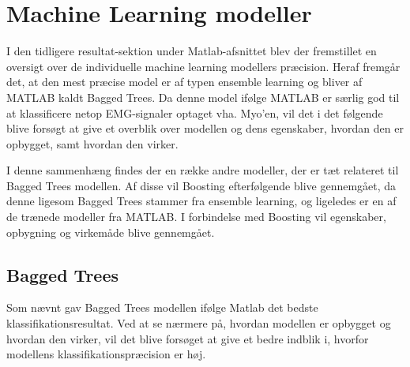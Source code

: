 \thispagestyle{fancy}
\chapter{Machine Learning modeller}
\label{chp:mlm}
I den tidligere resultat-sektion under Matlab-afsnittet blev der fremstillet en oversigt over de individuelle machine learning modellers præcision. Heraf fremgår det, at den mest præcise model er af typen ensemble learning og bliver af MATLAB kaldt Bagged Trees. Da denne model ifølge MATLAB er særlig god til at klassificere netop EMG-signaler optaget vha. Myo'en, vil det i det følgende blive forsøgt at give et overblik over modellen og dens egenskaber, hvordan den er opbygget, samt hvordan den virker. 

I denne sammenhæng findes der en række andre modeller, der er tæt relateret til Bagged Trees modellen. Af disse vil Boosting efterfølgende blive gennemgået, da denne ligesom Bagged Trees stammer fra ensemble learning, og ligeledes er en af de trænede modeller fra MATLAB. I forbindelse med Boosting vil egenskaber, opbygning og virkemåde blive gennemgået.

\section{Bagged Trees}
Som nævnt gav Bagged Trees modellen ifølge Matlab det bedste klassifikationsresultat.  Ved at se nærmere på, hvordan modellen er opbygget og hvordan den virker, vil det blive forsøget at give et bedre indblik i, hvorfor modellens klassifikationspræcision er høj. 

